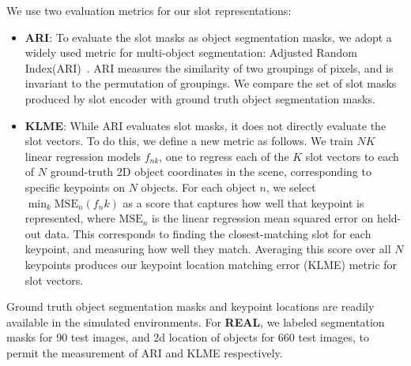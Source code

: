 \documentclass{article}
\newcommand{\jd}[1]{\textcolor{orange}{[DJ: #1]}}
\begin{document}
We use two evaluation metrics for our slot representations: %
\begin{itemize} [leftmargin=*]
    \item \textbf{ARI}: To evaluate the slot masks as object segmentation masks, we adopt a widely used metric for multi-object segmentation: Adjusted Random Index(ARI)~\cite{ari1,ari2}. ARI measures the similarity of two groupings of pixels, and is invariant to the permutation of groupings. We compare the set of slot masks produced by slot encoder with ground truth object segmentation masks.  %
    \item \textbf{KLME}: While ARI evaluates slot masks, it does not directly evaluate the slot vectors. To do this, we define a new metric as follows. We train $NK$ linear regression models $f_{nk}$, one to regress each of the $K$ slot vectors to each of $N$ ground-truth 2D object coordinates in the scene, corresponding to specific keypoints on $N$ objects. For each object $n$, we select $\min_k \text{MSE}_n(f_nk)$
    as a score that captures how well that keypoint is represented, where $\text{MSE}_n$ is the linear regression mean squared error on held-out data. This corresponds to finding the closest-matching slot for each keypoint, and measuring how well they match. 
    Averaging this score over all $N$ keypoints produces our keypoint location matching error (KLME) metric for slot vectors.  %
\end{itemize}

Ground truth object segmentation masks and keypoint locations are readily available in the simulated environments.  
For \textbf{REAL}, we labeled segmentation masks for 90 test images, and 2d location of objects for 660 test images, to permit the measurement of ARI and KLME respectively.
\end{document}
